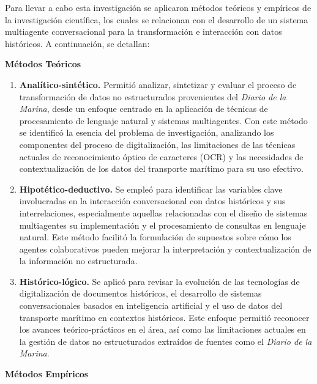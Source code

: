 Para llevar a cabo esta investigación se aplicaron métodos teóricos y empíricos de la investigación científica, los cuales se relacionan con el desarrollo de un sistema multiagente conversacional para la transformación e interacción con datos históricos. A continuación, se detallan:

\textbf{Métodos Teóricos}

\begin{enumerate}
	\item \textbf{Analítico-sintético.} Permitió analizar, sintetizar y evaluar el proceso de transformación de datos no estructurados provenientes del \textit{Diario de la Marina}, desde un enfoque centrado en la aplicación de técnicas de procesamiento de lenguaje natural y sistemas multiagentes. Con este método se identificó la esencia del problema de investigación, analizando los componentes del proceso de digitalización, las limitaciones de las técnicas actuales de reconocimiento óptico de caracteres (OCR) y las necesidades de contextualización de los datos del transporte marítimo para su uso efectivo.
	
	\item \textbf{Hipotético-deductivo.} Se empleó para identificar las variables clave involucradas en la interacción conversacional con datos históricos y sus interrelaciones, especialmente aquellas relacionadas con el diseño de sistemas multiagentes su implementación y el procesamiento de consultas en lenguaje natural. Este método facilitó la formulación de supuestos sobre cómo los agentes colaborativos pueden mejorar la interpretación y contextualización de la información no estructurada.
	
	\item \textbf{Histórico-lógico.} Se aplicó para revisar la evolución de las tecnologías de digitalización de documentos históricos, el desarrollo de sistemas conversacionales basados en inteligencia artificial y el uso de datos del transporte marítimo en contextos históricos. Este enfoque permitió reconocer los avances teórico-prácticos en el área, así como las limitaciones actuales en la gestión de datos no estructurados extraídos de fuentes como el \textit{Diario de la Marina}.
\end{enumerate}

\textbf{Métodos Empíricos}


